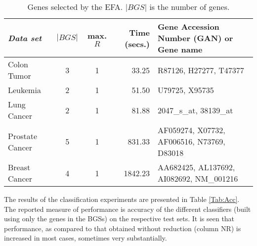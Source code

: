 \documentclass{article}
\begin{document}
\begin{table*}[!ht]
  \centering
  \begin{footnotesize}
  \begin{tabular}{|@{$~$}l@{$~$}|@{$~$}c@{$~$}|@{$~$}c@{$~$}|@{$~$}r@{$~$}|@{$~$}l@{$~$}|}
   \hline
   {\it Data set}   &$|BGS|$&max. $R$&Time (secs.)&Gene Accession
   Number (GAN) or Gene name\\
   \hline
   Colon Tumor     & 3& 1&  33.25& R87126, H27277, T47377\\
   Leukemia        & 2& 1&  51.50& U79725, X95735\\
   Lung Cancer     & 2& 1&  81.88& 2047\_s\_at, 38139\_at\\
   Prostate Cancer & 5& 1& 831.33& AF059274, X07732, AF006516, N73769, D83018\\
   Breast Cancer   & 4& 1&1842.23& AA682425, AL137692, AI082692, NM\_001216\\
   \hline
  \end{tabular}
  \end{footnotesize}
  \caption{Genes selected by the EFA. \textbf{$|BGS|$} is the number
    of genes.}\label{Tab:BGS}
\end{table*}

The results of the classification experiments are presented in Table
\ref{Tab:Acc}. The reported measure of performance is accuracy of the
different classifiers (built using only the genes in the BGSs) on the
respective test sets. It is seen that performance, as compared to
that obtained without reduction (column NR) is increased in most
cases, sometimes very substantially.
\end{document}
